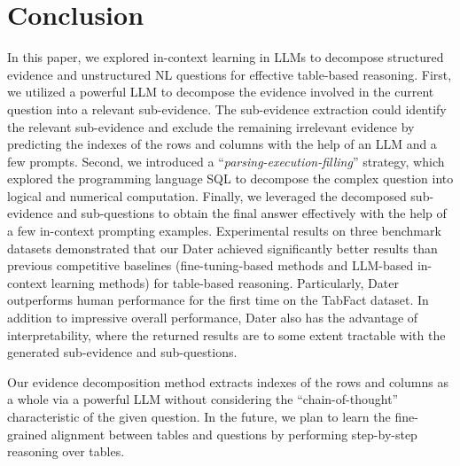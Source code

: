 \section{Conclusion}
In this paper, we explored in-context learning in LLMs to decompose structured evidence and unstructured NL questions for effective table-based reasoning. First, we utilized a powerful LLM to decompose the evidence involved in the current question into a relevant sub-evidence. The sub-evidence extraction could identify the relevant sub-evidence and exclude the remaining irrelevant evidence by predicting the indexes of the rows and columns with the help of an LLM and a few prompts.
Second, we introduced a ``\textit{parsing-execution-filling}'' strategy, which explored the programming language SQL to decompose the complex question into logical and numerical computation. 
Finally, we leveraged the decomposed sub-evidence and sub-questions to obtain the final answer effectively with the help of a few in-context prompting examples.   
Experimental results on three benchmark datasets demonstrated that our Dater achieved significantly better results than previous competitive baselines (fine-tuning-based methods and LLM-based in-context learning methods) for table-based reasoning. Particularly, Dater outperforms human performance for the first time on the TabFact dataset. In addition to impressive overall performance, Dater also has the advantage of interpretability, where the returned results are to some extent tractable with the generated sub-evidence and sub-questions. 

Our evidence decomposition method extracts indexes of the rows and columns as a whole via a powerful LLM without considering the ``chain-of-thought'' characteristic of the given question. In the future, we plan to learn the fine-grained alignment between tables and questions by performing step-by-step reasoning over tables.

